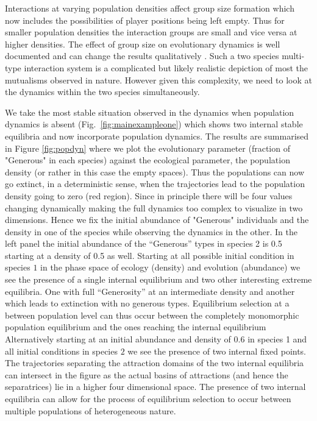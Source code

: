 \documentclass[12pt]{article}
\begin{document}
Interactions at varying population densities affect group size formation which now includes the possibilities of player positions being left empty. Thus for smaller population densities the interaction groups are small and vice versa at higher densities. The effect of group size on evolutionary dynamics is well documented and can change the results qualitatively \citep{pacheco:PRSB:2009,souza:JTB:2009}. 
Such a two species multi-type interaction system is a complicated but likely realistic depiction of most the mutualisms observed in nature. However given this complexity, we need to look at the dynamics within the two species simultaneously.

We take the most stable situation observed in the dynamics when population dynamics is absent (Fig.~\ref{fig:mainexampleone}) which shows two internal stable equilibria and now incorporate population dynamics. The results are summarised in Figure \ref{fig:popdyn} where we plot the evolutionary parameter (fraction of "Generous" in each species) against the ecological parameter, the population density (or rather in this case the empty spaces). Thus the populations can now go extinct, in a deterministic sense, when the trajectories lead to the population density going to zero (red region).  Since in principle there will be four values changing dynamically making the full dynamics too complex to visualize in two dimensions. Hence we fix the initial abundance of "Generous" individuals and the density in one of the species while observing the dynamics in the other. In the left panel the initial abundance of the “Generous” types in species 2 is 0.5 starting at a density of 0.5 as well. Starting at all possible initial condition in species $1$ in the phase space of ecology (density) and evolution (abundance) we see the presence of a single internal equilibrium and two other interesting extreme equilibria. One with full “Generosity” at an intermediate density and another which leads to extinction with no generous types. Equilibrium selection at a between population level can thus occur between the completely monomorphic population equilibrium and the ones reaching the internal equilibrium Alternatively starting at an initial abundance and density of $0.6$ in species 1 and all initial conditions in species $2$ we see the presence of two internal fixed points. The trajectories separating the attraction domains of the two internal equilibria can intersect in the figure as the actual basins of attractions (and hence the separatrices) lie in a higher four dimensional space. The presence of two internal equilibria can allow for the process of equilibrium selection to occur between multiple populations of heterogeneous nature.
\end{document}
